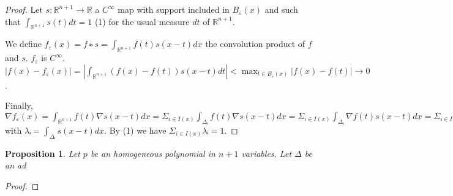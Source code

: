 \documentclass{article}
\newtheorem{prop}[theo]{Proposition}
\begin{document}
\begin{proof}
  Let $s:ℝ^{n+1} → ℝ$ a $C^∞$ map with support included in $B_ε(x)$ and such
  that $∫_{ℝ^{n+1}} s(t)dt = 1$ (1) for the usual measure $dt$ of $ℝ^{n+1}$.

  We define $f_ε(x) = f ∗ s = ∫_{ℝ^{n+1}} f(t)s(x-t) dx$ the convolution product of $f$ and
  $s$. $f_ε$ is $C^∞$. $|f(x) - f_ε(x)| = |∫_{ℝ^{n+1}} (f(x) - f(t))s(x-t) dt| <
  \max_{t∈B_ε(x)} |f(x) - f(t)| → 0$.

  Finally, $∇f_ε(x) = ∫_{ℝ^{n+1}} f(t)∇s(x-t) dx = Σ_{i∈I(x)}∫_{Δᵢ} f(t)∇s(x-t) dx =
    Σ_{i∈I(x)}∫_{Δᵢ} ∇f(t)s(x-t) dx = Σ_{i∈I(x)} λᵢ ∇ᵢf$ with
    $λᵢ = ∫_{Δᵢ} s(x-t) dx$. By (1) we have $Σ_{i∈I(x)} λᵢ = 1$.

  \end{proof}

  \begin{prop}
    Let $p$ be an homogeneous polynomial in $n+1$ variables.
    Let $Δ$ be an ad
  \end{prop}
  \begin{proof}

  \end{proof}
\end{document}
